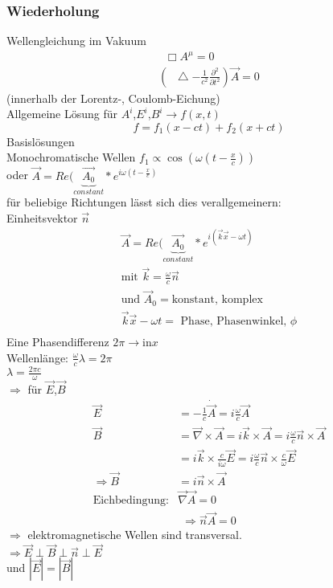 \documentclass[a4paper]{article}
\newcommand*\laplace{\mathop{}\!\mathbin\bigtriangleup}
\newcommand*\dalembert{\mathop{}\!\mathbin\Box}
\begin{document}
\subsubsection{Wiederholung}
Wellengleichung im Vakuum 
\begin{align}
\dalembert A^\mu=0\\
\left( \laplace - \frac{1}{c^2} \frac{\partial^2}{\partial t^2} \right)\vec{A}=0
\end{align}
(innerhalb der Lorentz-, Coulomb-Eichung)\\
Allgemeine Lösung für $A^i$,$E^i$,$B^i\rightarrow f(x,t)$
\begin{equation}
f=f_1(x-ct)+f_2(x+ct)
\end{equation}
Basislösungen\\
Monochromatische Wellen $f_1\propto \cos(\omega \left( t-\frac{x}{c}
\right))$\\
oder $\vec{A}=Re(\underbrace{\vec{A_0}}_{constant} *
e^{i\omega(t-\frac{x}{c})}$\\ 
für beliebige Richtungen lässt sich dies verallgemeinern:\\
Einheitsvektor $\vec{n}$ 
\begin{align}
\vec{A}=Re(\underbrace{\vec{A_0}}_{constant} * e^{i(\vec{k}\vec{x}-\omega t)}\\
\text{mit }\vec{k}=\frac{\omega}{c}\vec{n}\\
\text{und }\vec{A}_0= \text{konstant, komplex}\\
\vec{k}\vec{x}-\omega t =\text{ Phase, Phasenwinkel, }\phi\\
\end{align}
Eine Phasendifferenz $2\pi \rightarrow \text{in} x$\\
Wellenlänge: $\frac{\omega}{c}\lambda=2\pi$\\
$\lambda=\frac{2\pi c}{\omega}$\\
$\Rightarrow$ für $\vec{E}$,$\vec{B}$
\begin{align}
\vec{E}&=-\frac{1}{c}\dot{\vec{A}}=i\frac{\omega}{c}\vec{A}\\
\vec{B}&=\vec{\nabla}\times\vec{A}=i\vec{k}\times\vec{A}=i\frac{\omega}{c}\vec{n}\times\vec{A}\\
&=i\vec{k}\times\frac{c}{i\omega}\vec{E}=i\frac{\omega}{c}\vec{n}\times\frac{c}{\omega}\vec{E}\\
\Rightarrow \vec{B}&=i\vec{n}\times\vec{A}\\
\text{Eichbedingung}: & \vec{\nabla}\vec{A}=0
\end{align}
\begin{align}
\Rightarrow \vec{n}\vec{A}=0
\end{align}
$\Rightarrow$ elektromagnetische Wellen sind transversal.\\
$\Rightarrow \vec{E}\perp\vec{B}\perp\vec{n}\perp\vec{E}$\\
und $|\vec{E}|=|\vec{B}|$\\
\end{document}

